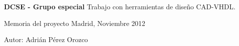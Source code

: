\begin{titlepage}
\sffamily
\begin{flushright}

\rightskip=-0cm


\vspace*{3cm}


\huge{\textbf{DCSE - Grupo especial}}
\linebreak
\LARGE{Trabajo con herramientas de diseño CAD-VHDL.}

\vspace*{10cm}




\large{Memoria del proyecto}
\linebreak
\normalsize{Madrid, Noviembre 2012}

\vspace*{3cm}


\normalsize{Autor:}
\linebreak
\large{Adrián Pérez Orozco}
\linebreak

\end{flushright}
\end{titlepage}
